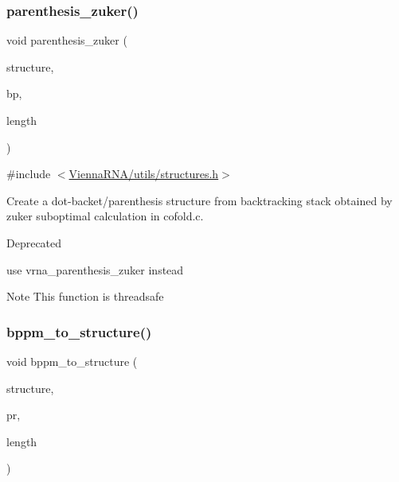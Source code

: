 \subsubsection{\texorpdfstring{parenthesis\_zuker()}{parenthesis\_zuker()}}
{\footnotesize\ttfamily void parenthesis\+\_\+zuker (\begin{DoxyParamCaption}\item[{char $\ast$}]{structure,  }\item[{\mbox{\hyperlink{group__data__structures_gaa651bda42e7692f08cb603cd6834b0ee}{vrna\+\_\+bp\+\_\+stack\+\_\+t}} $\ast$}]{bp,  }\item[{int}]{length }\end{DoxyParamCaption})}



{\ttfamily \#include $<$\mbox{\hyperlink{utils_2structures_8h}{Vienna\+R\+N\+A/utils/structures.\+h}}$>$}



Create a dot-\/backet/parenthesis structure from backtracking stack obtained by zuker suboptimal calculation in cofold.\+c. 

\begin{DoxyRefDesc}{Deprecated}
\item[\mbox{\hyperlink{deprecated__deprecated000209}{Deprecated}}]use vrna\+\_\+parenthesis\+\_\+zuker instead\end{DoxyRefDesc}
\begin{DoxyNote}{Note}
This function is threadsafe 
\end{DoxyNote}
\mbox{\label{group__struct__utils__deprecated_ga129d81c4a1ead793c5b2311333e03dfa}} 
\subsubsection{\texorpdfstring{bppm\_to\_structure()}{bppm\_to\_structure()}}
{\footnotesize\ttfamily void bppm\+\_\+to\+\_\+structure (\begin{DoxyParamCaption}\item[{char $\ast$}]{structure,  }\item[{\mbox{\hyperlink{group__data__structures_ga31125aeace516926bf7f251f759b6126}{F\+L\+T\+\_\+\+O\+R\+\_\+\+D\+BL}} $\ast$}]{pr,  }\item[{unsigned int}]{length }\end{DoxyParamCaption})}



